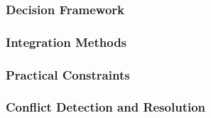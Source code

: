 \documentclass{article}
\begin{document}
\subsubsection{Decision Framework}

\subsubsection{Integration Methods}

\subsubsection{Practical Constraints}

\subsubsection{Conflict Detection and Resolution}
\end{document}
